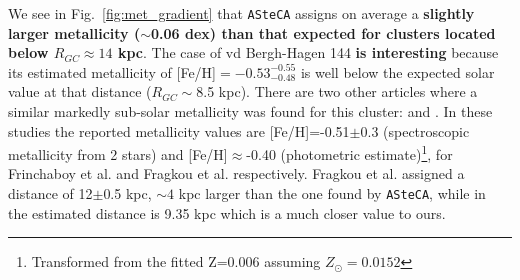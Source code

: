 \documentclass[referee]{aa}
\begin{document}
  We see in Fig.~\ref{fig:met_gradient} that \texttt{ASteCA} assigns on
  average a \textbf{slightly larger metallicity ($\sim$0.06 dex) than that
  expected for clusters located below $R_{GC}\approx14$ kpc}.
  The case of vd Bergh-Hagen 144 \textbf{is interesting} because its estimated
  metallicity of [Fe/H]$=-0.53_{-0.48}^{-0.55}$ is well below the expected
  solar value at that distance ($R_{GC}\sim$8.5 kpc). There are two other
  articles where a similar markedly sub-solar metallicity was found
  for this cluster: \cite{Frinchaboy_2004} and \cite{Fragkou_2019}. In these
  studies the reported metallicity values are [Fe/H]=-0.51$\pm$0.3 
  (spectroscopic metallicity from 2 stars) and [Fe/H]$\approx$-0.40 (photometric
  estimate)\footnote{Transformed from the fitted Z=0.006 assuming
  $Z_{\odot}=0.0152$}, for Frinchaboy et al. and Fragkou et al. respectively.
  Fragkou et al. assigned a distance of 12$\pm$0.5 kpc, $\sim4$ kpc
  larger than the one found by \texttt{ASteCA}, while in~\cite{Frinchaboy_2004b}
  the estimated distance is 9.35 kpc which is a much closer value to ours.
\end{document}
